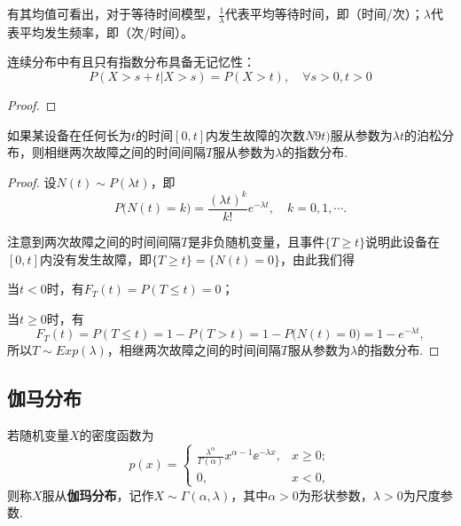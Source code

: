 \begin{remark}
    有其均值可看出，对于等待时间模型，$\frac{1}{\lambda}$代表平均等待时间，即（时间/次）；$\lambda$代表平均发生频率，即（次/时间）。
\end{remark}

\begin{theorem}[指数分布的无记忆性]
    连续分布中有且只有指数分布具备无记忆性：
    \[ P(X > s + t| X > s) = P( X > t) ,\quad \forall s>0,t>0\]
\end{theorem}

\begin{proof}
\end{proof}

\begin{proposition}
    如果某设备在任何长为$t$的时间$[0,t]$内发生故障的次数$N9t)$服从参数为$\lambda t$的泊松分布，则相继两次故障之间的时间间隔$T$服从参数为$\lambda$的指数分布.
\end{proposition}

\begin{proof}
    设$N(t)\sim P(\lambda t)$，即
    \[
        P\big( N(t) = k \big) = \frac{(\lambda t)^k}{k!} e^{-\lambda t},\quad k=0,1,\cdots.
    \]

    注意到两次故障之间的时间间隔$T$是非负随机变量，且事件$\{T\ge t\}$说明此设备在$[0,t]$内没有发生故障，即$\{T\ge t\}=\{N(t)=0\}$，由此我们得

    当$t<0$时，有$F_T(t)=P(T\le t)=0$；

    当$t\ge0$时，有
    \[
        F_T(t) = P(T\le t) = 1 - P(T>t) = 1 -P\big( N(t)=0 \big) = 1 - e^{-\lambda t},
    \]
    所以$T\sim Exp(\lambda)$，相继两次故障之间的时间间隔$T$服从参数为$\lambda$的指数分布.
\end{proof}

\subsection{伽马分布}

\begin{definition}
    若随机变量$X$的密度函数为
    \[ p(x) = \begin{cases}
            \frac{\lambda^\alpha}{\Gamma(\alpha)}x^{\alpha-1}
            \ee^{-\lambda x}, & x\ge 0 ; \\
            0,                & x < 0,
        \end{cases} \]
    则称$X$服从\textbf{伽玛分布}，记作$X\sim \Gamma(\alpha,\lambda)$，其中$\alpha>0$为形状参数，$\lambda>0$为尺度参数.
\end{definition}



